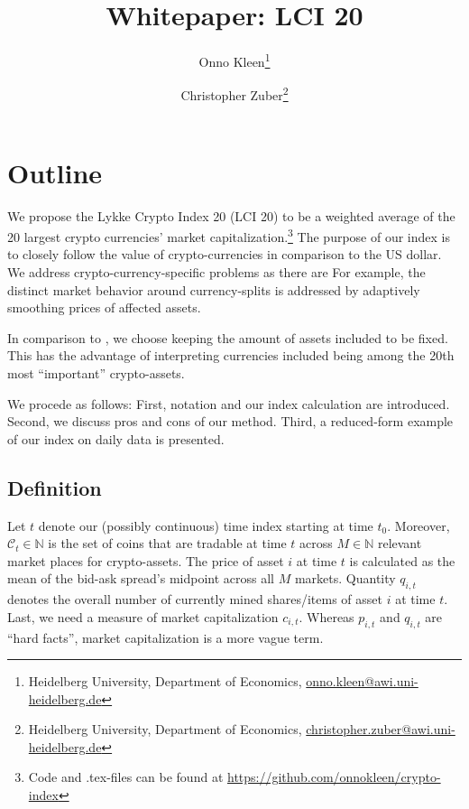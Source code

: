 \documentclass[11pt]{article}
\title{Whitepaper: LCI 20}
\author{
Onno Kleen\thanks{Heidelberg University, Department of Economics, \href{mailto:onno.kleen@awi.uni-heidelberg.de}{onno.kleen@awi.uni-heidelberg.de}}
\and
Christopher Zuber\thanks{Heidelberg University, Department of Economics, \href{mailto:christopher.zuber@awi.uni-heidelberg.de}{christopher.zuber@awi.uni-heidelberg.de}}
}
\begin{document}
\maketitle
\section{Outline}

We propose the Lykke Crypto Index 20 (LCI 20) to be a weighted average of the 20 largest crypto currencies' market capitalization.\footnote{Code and .tex-files can be found at \href{https://github.com/onnokleen/crypto-index}{https://github.com/onnokleen/crypto-index}}
The purpose of our index is to closely follow the value of crypto-currencies in comparison to the US dollar.
We address crypto-currency-specific problems as there are
For example, the distinct market behavior around currency-splits is addressed by adaptively smoothing prices of affected assets.

In comparison to \cite{Trimborn2016}, we choose keeping the amount of assets included to be fixed.
This has the advantage of interpreting currencies included being among the 20th most ``important'' crypto-assets.

We procede as follows:
First, notation and our index calculation are introduced.
Second, we discuss pros and cons of our method.
Third, a reduced-form example of our index on daily data is presented.

\subsection{Definition}

Let $t$ denote our (possibly continuous) time index starting at time $t_0$.
Moreover, $\mathcal{C}_t \in \mathbb{N}$ is the set of coins that are tradable at time $t$ across $M \in \mathbb{N}$ relevant market places for crypto-assets.
The price of asset $i$ at time $t$ is calculated as the mean of the bid-ask spread's midpoint across all $M$ markets.
Quantity $q_{i,t}$ denotes the overall number of currently mined shares/items of asset $i$ at time $t$.
Last, we need a measure of market capitalization $c_{i,t}$.
Whereas $p_{i,t}$ and $q_{i,t}$ are ``hard facts'', market capitalization is a more vague term.
\end{document}
